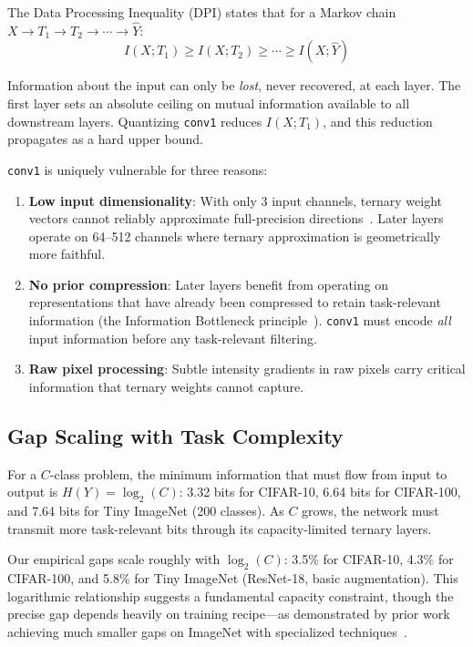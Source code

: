 \documentclass[10pt]{article}
\begin{document}
The Data Processing Inequality (DPI) states that for a Markov chain $X \to T_1 \to T_2 \to \cdots \to \hat{Y}$:
\begin{equation}
    I(X; T_1) \geq I(X; T_2) \geq \cdots \geq I(X; \hat{Y})
\end{equation}

Information about the input can only be \emph{lost}, never recovered, at each layer. The first layer sets an absolute ceiling on mutual information available to all downstream layers. Quantizing \texttt{conv1} reduces $I(X; T_1)$, and this reduction propagates as a hard upper bound.

\texttt{conv1} is uniquely vulnerable for three reasons:
\begin{enumerate}
    \item \textbf{Low input dimensionality}: With only 3 input channels, ternary weight vectors cannot reliably approximate full-precision directions~\cite{anderson2018binary}. Later layers operate on 64--512 channels where ternary approximation is geometrically more faithful.
    \item \textbf{No prior compression}: Later layers benefit from operating on representations that have already been compressed to retain task-relevant information (the Information Bottleneck principle~\cite{tishby2015deep}). \texttt{conv1} must encode \emph{all} input information before any task-relevant filtering.
    \item \textbf{Raw pixel processing}: Subtle intensity gradients in raw pixels carry critical information that ternary weights cannot capture.
\end{enumerate}

\subsection{Gap Scaling with Task Complexity}

For a $C$-class problem, the minimum information that must flow from input to output is $H(Y) = \log_2(C)$: 3.32 bits for CIFAR-10, 6.64 bits for CIFAR-100, and 7.64 bits for Tiny ImageNet (200 classes). As $C$ grows, the network must transmit more task-relevant bits through its capacity-limited ternary layers.

Our empirical gaps scale roughly with $\log_2(C)$: 3.5\% for CIFAR-10, 4.3\% for CIFAR-100, and 5.8\% for Tiny ImageNet (ResNet-18, basic augmentation). This logarithmic relationship suggests a fundamental capacity constraint, though the precise gap depends heavily on training recipe---as demonstrated by prior work achieving much smaller gaps on ImageNet with specialized techniques~\cite{liu2020reactnet,guo2022bnext}.
\end{document}
